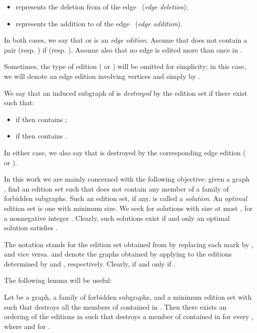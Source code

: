 \documentclass[12pt]{article}
\begin{document}
\begin{itemize}

\item  represents the deletion from  of the edge  \ ({\em edge deletion});

\item  represents the addition to  of the edge  \ ({\em edge addition}).

\end{itemize}

In both cases, we say that  or  is an {\em edge edition}.
Assume that  does not contain a pair  (resp. ) if  (resp. ).
Assume also that no edge is edited more than once in .

Sometimes, the type of edition ( or ) will be omitted for simplicity; in this case,
we will denote an edge edition involving vertices  and  simply by .

We say that an induced subgraph  of  is {\em destroyed} by the edition
set  if there exist  such that:

\begin{itemize}

\item  if  then  contains ;

\item  if  then  contains .

\end{itemize}

In either case, we also say that  is destroyed by the corresponding edge edition ( or ).

In this work we are mainly concerned with the following objective: given a graph ,
find an edition set  such that  does not contain
any member of a family  of forbidden subgraphs. Such an edition set, if any, is called a {\em solution}.
An {\em optimal} edition set  is one with minimum size. We seek for solutions with size at most ,
for a nonnegative integer . Clearly, such solutions exist if and only an optimal solution  satisfies .

The notation  stands for the edition set obtained from
 by replacing each mark  by , and vice versa.  and
 denote the graphs obtained by applying to  the editions
determined by  and , respectively. Clearly,  if and
only if .

The following lemma will be useful:

\begin{lema} \label{orderF}
Let  be a graph,  a family of forbidden subgraphs, and  a minimum edition set with  such that  destroys all the members of  contained in . Then there exists an ordering  of the editions in  such that  destroys a member of  contained in  for every , where  and  for .
\end{lema}
\end{document}
